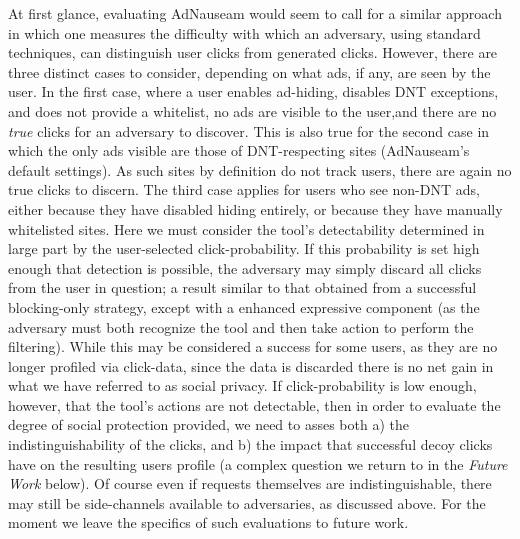 \documentclass[conference]{IEEEtran}
\begin{document}
At first glance, evaluating AdNauseam would seem to call for a similar approach in which one measures the difficulty with which an adversary, using standard techniques, can distinguish user clicks from generated clicks. However, there are three distinct cases to consider, depending on what ads, if any, are seen by the user. In the first case, where a user enables ad-hiding, disables DNT exceptions, and does not provide a whitelist, no ads are visible to the user,and  there are no \emph{true} clicks for an adversary to discover. This is also true for the second case in which the only ads visible are those of DNT-respecting sites (AdNauseam's default settings). As such sites by definition do not track users, there are again no true clicks to discern. The third case applies for users who see non-DNT ads, either because they have disabled hiding entirely, or because they have manually whitelisted sites. Here we must consider the tool's detectability determined in large part by the user-selected click-probability. If this probability is set high enough that detection is possible, the adversary may simply discard all clicks from the user in question; a result similar to that obtained from a successful blocking-only strategy, except with a enhanced expressive component (as the adversary must both recognize the tool and then take action to perform the filtering). While this may be considered a success for some users, as they are no longer profiled via click-data, since the data is discarded there is no net gain in what we have referred to as social privacy. If click-probability is low enough, however, that the tool's actions are not detectable, then in order to evaluate the degree of social protection provided, we need to asses both a) the indistinguishability of the clicks, and b) the impact that successful decoy clicks have on the resulting users profile (a complex question we return to in the \emph{Future Work} below). Of course even if requests themselves are indistinguishable, there may still be side-channels available to adversaries, as discussed above. For the moment we leave the specifics of such evaluations to future work.
\end{document}
